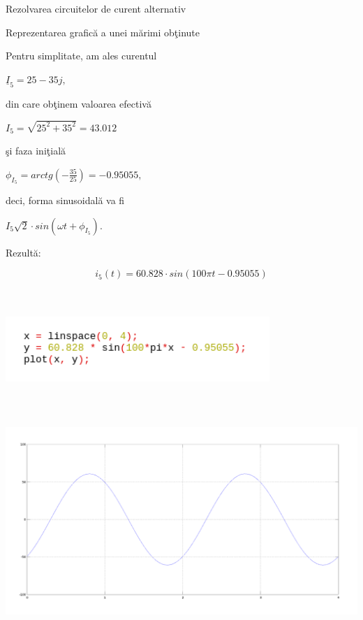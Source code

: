 \documentclass[a4paper]{article}
\begin{document}
\begin{section}{Rezolvarea circuitelor de curent alternativ}

\begin{subsection}{Reprezentarea grafic\u a a unei m\u arimi ob\c tinute \\[0.5cm]}
	
	Pentru simplitate, am ales curentul \begin{large} $ \underline{I}_5 = 25 - 35j, $ \end{large} din care ob\c tinem valoarea efectiv\u a \begin{large} $ I_5 = \sqrt{25^2 + 35^ 2} = 43.012 $ \end{large} \c si faza ini\c tial\u a \begin{large} $ \phi_{I_5} = arctg(-\frac{35}{25}) = -0.95055, $ \end{large} deci, forma sinusoidal\u a va fi \begin{large} $ I_5\sqrt2 \cdot sin(\omega t + \phi_{I_5}). $ \end{large} Rezult\u a:
	\begin{large} $$ i_5(t) = 60.828 \cdot sin(100\pi t - 0.95055) $$ \end{large} \\
	
\begin{center}
	\includegraphics[width=10cm, height=2.75cm]{octave3.png}
	\includegraphics[width=15cm, height=10cm]{grafic.png} \\[1.5cm]
\end{center}

\end{subsection}
\end{section}
\end{document}
